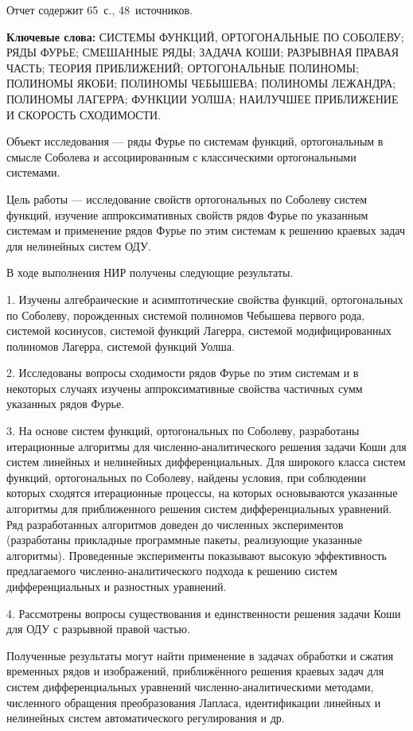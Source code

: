 \Referat %

Отчет содержит 65~с., 48~источников.

 \bigskip
 \textbf{ Ключевые
  слова:}
  СИСТЕМЫ ФУНКЦИЙ, ОРТОГОНАЛЬНЫЕ ПО СОБОЛЕВУ; РЯДЫ ФУРЬЕ; СМЕШАННЫЕ РЯДЫ; ЗАДАЧА КОШИ; РАЗРЫВНАЯ ПРАВАЯ ЧАСТЬ;
  ТЕОРИЯ ПРИБЛИЖЕНИЙ; ОРТОГОНАЛЬНЫЕ ПОЛИНОМЫ; ПОЛИНОМЫ ЯКОБИ; ПОЛИНОМЫ ЧЕБЫШЕВА; ПОЛИНОМЫ ЛЕЖАНДРА; ПОЛИНОМЫ ЛАГЕРРА; ФУНКЦИИ УОЛША; НАИЛУЧШЕЕ ПРИБЛИЖЕНИЕ И \linebreak СКОРОСТЬ СХОДИМОСТИ.

 \bigskip

Объект исследования --- ряды Фурье по системам функций, ортогональным в смысле Соболева и ассоциированным с классическими ортогональными системами.

Цель работы --- исследование свойств ортогональных по Соболеву систем функций, изучение аппроксимативных свойств рядов Фурье по указанным системам и применение рядов Фурье по этим системам к решению краевых задач для нелинейных систем ОДУ.

В ходе выполнения НИР получены следующие результаты. 

1. Изучены алгебраические и асимптотические свойства функций, ортогональных по Соболеву, порожденных системой полиномов Чебышева первого рода, системой косинусов, системой функций Лагерра, системой модифицированных полиномов Лагерра, системой функций Уолша. 

2. Исследованы вопросы сходимости рядов Фурье по этим системам и в некоторых случаях изучены аппроксимативные свойства частичных сумм указанных рядов Фурье.

3. На основе систем функций, ортогональных по Соболеву, разработаны итерационные алгоритмы для численно-аналитического решения задачи Коши для систем линейных и нелинейных дифференциальных. Для широкого класса систем функций, ортогональных по Соболеву, найдены условия, при соблюдении которых сходятся итерационные процессы, на которых основываются указанные алгоритмы для приближенного решения систем дифференциальных уравнений.
Ряд разработанных алгоритмов доведен до численных экспериментов (разработаны прикладные программные пакеты, реализующие указанные алгоритмы).
Проведенные эксперименты показывают высокую эффективность предлагаемого численно-аналитического подхода к решению систем дифференциальных и разностных уравнений.

4. Рассмотрены вопросы существования и единственности решения задачи Коши для ОДУ с разрывной правой частью.
  
Полученные результаты могут найти применение в задачах обработки и сжатия временных рядов и изображений, приближённого решения краевых задач для систем дифференциальных уравнений численно-аналитическими методами, численного обращения преобразования Лапласа, идентификации линейных и нелинейных систем автоматического регулирования и др.
